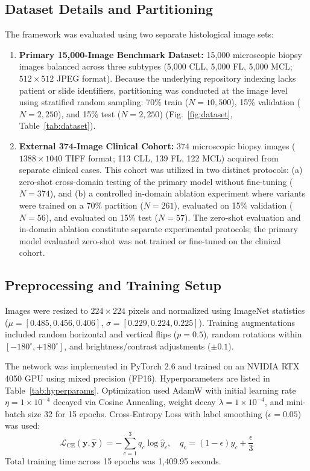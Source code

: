 \documentclass[conference]{IEEEtran}
\begin{document}
\subsection{Dataset Details and Partitioning}
The framework was evaluated using two separate histological image sets:
\begin{enumerate}
    \item \textbf{Primary 15,000-Image Benchmark Dataset:} 15,000 microscopic biopsy images balanced across three subtypes (5,000 CLL, 5,000 FL, 5,000 MCL; $512 \times 512$ JPEG format). Because the underlying repository indexing lacks patient or slide identifiers, partitioning was conducted at the image level using stratified random sampling: 70\% train ($N=10,500$), 15\% validation ($N=2,250$), and 15\% test ($N=2,250$) (Fig.~\ref{fig:dataset}, Table~\ref{tab:dataset}).
    \item \textbf{External 374-Image Clinical Cohort:} 374 microscopic biopsy images ($1388 \times 1040$ TIFF format; 113 CLL, 139 FL, 122 MCL) acquired from separate clinical cases. This cohort was utilized in two distinct protocols: (a) zero-shot cross-domain testing of the primary model without fine-tuning ($N=374$), and (b) a controlled in-domain ablation experiment where variants were trained on a 70\% partition ($N=261$), evaluated on 15\% validation ($N=56$), and evaluated on 15\% test ($N=57$). The zero-shot evaluation and in-domain ablation constitute separate experimental protocols; the primary model evaluated zero-shot was not trained or fine-tuned on the clinical cohort.
\end{enumerate}

\subsection{Preprocessing and Training Setup}
Images were resized to $224 \times 224$ pixels and normalized using ImageNet statistics ($\mu = [0.485, 0.456, 0.406]$, $\sigma = [0.229, 0.224, 0.225]$). Training augmentations included random horizontal and vertical flips ($p=0.5$), random rotations within $[-180^\circ, +180^\circ]$, and brightness/contrast adjustments ($\pm 0.1$).

The network was implemented in PyTorch 2.6 and trained on an NVIDIA RTX 4050 GPU using mixed precision (FP16). Hyperparameters are listed in Table~\ref{tab:hyperparams}. Optimization used AdamW with initial learning rate $\eta = 1 \times 10^{-4}$ decayed via Cosine Annealing, weight decay $\lambda = 1 \times 10^{-4}$, and mini-batch size 32 for 15 epochs. Cross-Entropy Loss with label smoothing ($\epsilon = 0.05$) was used:
\begin{equation}
\label{eq:label_smoothing}
\mathcal{L}_{\text{CE}}(\mathbf{y}, \hat{\mathbf{y}}) = -\sum_{c=1}^3 q_c \log \hat{y}_c, \quad q_c = (1 - \epsilon) y_c + \frac{\epsilon}{3}
\end{equation}
Total training time across 15 epochs was 1,409.95 seconds.
\end{document}
